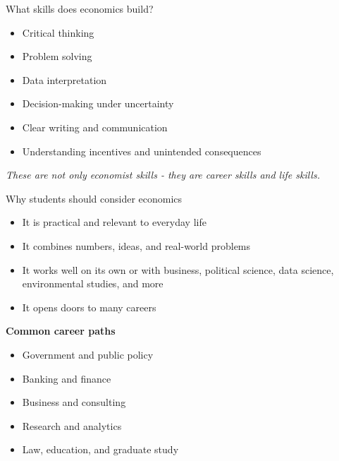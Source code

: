 \documentclass[aspectratio=169,11pt]{beamer}
\begin{document}
\begin{frame}{What skills does economics build?}
\begin{itemize}
    \item Critical thinking
    \item Problem solving
    \item Data interpretation
    \item Decision-making under uncertainty
    \item Clear writing and communication
    \item Understanding incentives and unintended consequences
\end{itemize}
\vspace{0.4cm}
\textit{These are not only economist skills - they are career skills and life skills.}
\end{frame}

\begin{frame}{Why students should consider economics}
\begin{itemize}
    \item It is practical and relevant to everyday life
    \item It combines numbers, ideas, and real-world problems
    \item It works well on its own or with business, political science, data science, environmental studies, and more
    \item It opens doors to many careers
\end{itemize}
\vspace{0.4cm}
\textbf{Common career paths}
\begin{itemize}
    \item Government and public policy
    \item Banking and finance
    \item Business and consulting
    \item Research and analytics
    \item Law, education, and graduate study
\end{itemize}
\end{frame}
\end{document}
